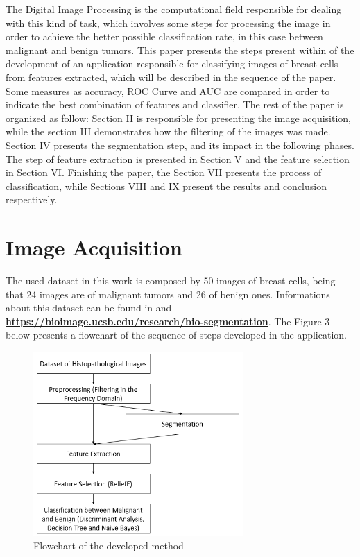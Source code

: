 \documentclass[conference]{IEEEtran}
\begin{document}
\par The Digital Image Processing is the computational field responsible for dealing with this kind of task, which involves some steps for processing the image in order to achieve the better possible classification rate, in this case between malignant and benign tumors. This paper presents the steps present within of the development of an application responsible for classifying images of breast cells from features extracted, which will be described in the sequence of the paper. Some measures as accuracy, ROC Curve and AUC are compared in order to indicate the best combination of features and classifier. The rest of the paper is organized as follow:  Section II is responsible for presenting the image acquisition, while the section III demonstrates how the filtering of the images was made. Section IV presents the segmentation step, and its impact in the following phases. The step of feature extraction is presented in Section V and the feature selection in Section VI. Finishing the paper, the Section VII presents the process of classification, while Sections VIII and IX present the results and conclusion respectively.

\section{Image Acquisition}
\par The used dataset in this work is composed by 50 images of breast cells, being that 24 images are of malignant tumors and 26 of benign ones. Informations about this dataset can be found in \cite{artigo_database} and \href{https://bioimage.ucsb.edu/research/bio-segmentation}{\textbf{https://bioimage.ucsb.edu/research/bio-segmentation}}. The Figure 3 below presents a flowchart of the sequence of steps developed in the application.

\begin{figure}[h]
    \centering
    \includegraphics[width=8cm]{images/imagem3.png}
    \caption{Flowchart of the developed method}
    \label{fig:my_label}
\end{figure}
\end{document}
